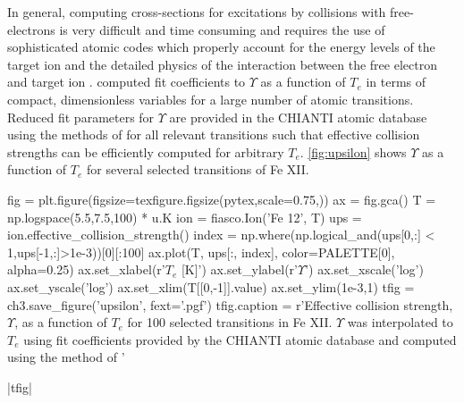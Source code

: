 In general, computing cross-sections for excitations by collisions with free-electrons is very difficult and time consuming and requires the use of sophisticated atomic codes which properly account for the energy levels of the target ion and the detailed physics of the interaction between the free electron and target ion \citep[][section 4.2.3]{phillips_ultraviolet_2008,bautista_theoretical_2000}. \citet{burgess_analysis_1992} computed fit coefficients to $\Upsilon$ as a function of $T_e$ in terms of compact, dimensionless variables for a large number of atomic transitions. Reduced fit parameters for $\Upsilon$ are provided in the CHIANTI atomic database using the methods of \citet{burgess_analysis_1992} for all relevant transitions such that effective collision strengths can be efficiently computed for arbitrary $T_e$. \autoref{fig:upsilon} shows $\Upsilon$ as a function of $T_e$ for several selected transitions of Fe XII.

\begin{pycode}[chapter3]
fig = plt.figure(figsize=texfigure.figsize(pytex,scale=0.75,))
ax = fig.gca()
T = np.logspace(5.5,7.5,100) * u.K
ion = fiasco.Ion('Fe 12', T)
ups = ion.effective_collision_strength()
index = np.where(np.logical_and(ups[0,:] < 1,ups[-1,:]>1e-3))[0][:100]
ax.plot(T, ups[:, index], color=PALETTE[0], alpha=0.25)
ax.set_xlabel(r'$T_e$ [K]')
ax.set_ylabel(r'$\Upsilon$')
ax.set_xscale('log')
ax.set_yscale('log')
ax.set_xlim(T[[0,-1]].value)
ax.set_ylim(1e-3,1)
tfig = ch3.save_figure('upsilon', fext='.pgf')
tfig.caption = r'Effective collision strength, $\Upsilon$, as a function of $T_e$ for 100 selected transitions in Fe XII. $\Upsilon$ was interpolated to $T_e$ using fit coefficients provided by the CHIANTI atomic database and computed using the method of \citet{burgess_analysis_1992}'
\end{pycode}
\py[chapter3]|tfig|

